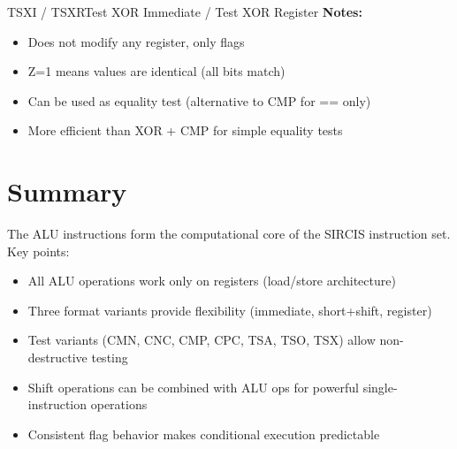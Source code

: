 \begin{instructionbox}{TSXI / TSXR}{Test XOR Immediate / Test XOR Register}
	\textbf{Notes:}
	\begin{itemize}
		\item Does not modify any register, only flags
		\item Z=1 means values are identical (all bits match)
		\item Can be used as equality test (alternative to CMP for == only)
		\item More efficient than XOR + CMP for simple equality tests
	\end{itemize}
\end{instructionbox}

\section{Summary}

The ALU instructions form the computational core of the SIRCIS instruction set. Key points:

\begin{itemize}
	\item All ALU operations work only on registers (load/store architecture)
	\item Three format variants provide flexibility (immediate, short+shift, register)
	\item Test variants (CMN, CNC, CMP, CPC, TSA, TSO, TSX) allow non-destructive testing
	\item Shift operations can be combined with ALU ops for powerful single-instruction operations
	\item Consistent flag behavior makes conditional execution predictable
\end{itemize}
